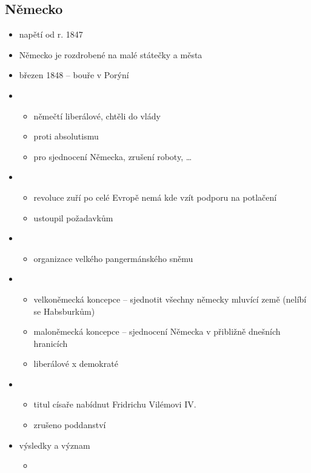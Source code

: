 \subsection{Německo}
\begin{itemize}
\item napětí od r. 1847
\item Německo je rozdrobené na malé státečky a města
\item březen 1848 -- bouře v Porýní
\item {}
	\begin{itemize}
	\item němečtí liberálové, chtěli do vlády
	\item proti absolutismu
	\item pro sjednocení Německa, zrušení roboty, \ldots
	\end{itemize}
\item {}
	\begin{itemize}
	\item revoluce zuří po celé Evropě \ra nemá kde vzít podporu na potlačení
	\item ustoupil požadavkům
	\end{itemize}
\item {}
	\begin{itemize}
	\item organizace velkého pangermánského sněmu
	\end{itemize}
\item {}
	\begin{itemize}
	\item velkoněmecká koncepce -- sjednotit všechny německy mluvící země (nelíbí se Habsburkům)
	\item maloněmecká koncepce -- sjednocení Německa v přibližně dnešních hranicích
	\item liberálové x demokraté
	\end{itemize}
\item {}
	\begin{itemize}
	\item titul císaře nabídnut Fridrichu Vilémovi IV.
	\item zrušeno poddanství
	\end{itemize}
\item výsledky a význam
	\begin{itemize}
	\item {}

\end{itemize}
\end{itemize}
